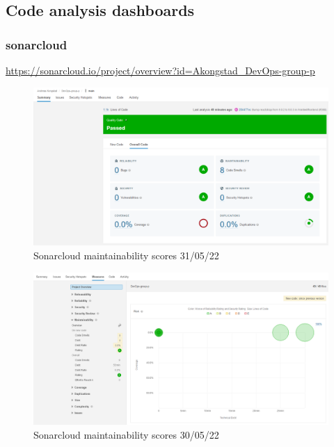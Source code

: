 \subsection{Code analysis dashboards}
\label{app:codeAnal}

\subsubsection{sonarcloud}
\label{app:codeAnalSonar}
\href{https://sonarcloud.io/project/overview?id=Akongstad_DevOps-group-p}{https://sonarcloud.io/project/overview?id=Akongstad\_DevOps-group-p}

\begin {figure}[H]
    \centering
    \includegraphics[scale=0.42]{images/analysis_tools/Sonar cloud backend.PNG}
    \caption{Sonarcloud maintainability scores 31/05/22}
    \label{fig:cloudMaintainability}
\end{figure}

\begin {figure}[H]
    \centering
    \includegraphics[scale=0.41]{images/analysis_tools/analys debt.PNG}
    \caption{Sonarcloud maintainability scores 30/05/22}
    \label{fig:cloudMaintainability}
\end{figure}

